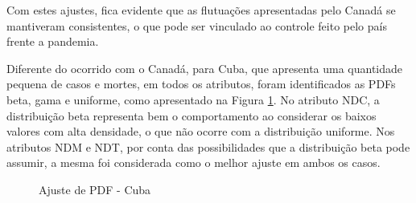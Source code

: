 \documentclass[a4paper,12pt]{article}
\begin{document}
\par Com estes ajustes, fica evidente que as flutuações apresentadas pelo Canadá se mantiveram consistentes, o que pode ser vinculado ao controle feito pelo país frente a pandemia.

\par Diferente do ocorrido com o Canadá, para Cuba, que apresenta uma quantidade pequena de casos e mortes, em todos os atributos, foram identificados as PDFs beta, gama e uniforme, como apresentado na Figura \ref{figure:pdf3}. No atributo NDC, a distribuição beta representa bem o comportamento ao considerar os baixos valores com alta densidade, o que não ocorre com a distribuição uniforme. Nos atributos NDM e NDT, por conta das possibilidades que a distribuição beta pode assumir, a mesma foi considerada como o melhor ajuste em ambos os casos.

\begin{figure}[H]
\captionsetup[subfigure]{labelformat=empty}
\caption{Ajuste de PDF - Cuba}
\qquad
{}
\qquad
\centering
{}
\label{figure:pdf3}
\end{figure}
\end{document}
